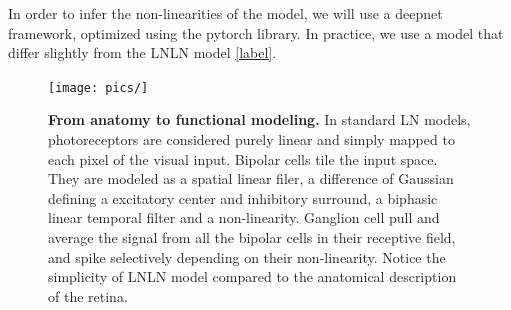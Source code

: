 In order to infer the non-linearities of the model, we will use a deepnet framework, optimized using the pytorch library.
In practice, we use a model that differ slightly from the LNLN model \ref*{label}.

\begin{figure}[h]
    \centering
    \texttt{[image: pics/]}
    \caption{\textbf{From anatomy to functional modeling.} In standard LN
        models,
        photoreceptors are considered purely linear and simply mapped to each
        pixel of
        the visual input. Bipolar cells tile the input space. They are modeled
        as a
        spatial linear filer, a difference of Gaussian defining a excitatory
        center and
        inhibitory surround, a biphasic linear temporal filter and a
        non-linearity.
        Ganglion cell pull and average the signal from all the bipolar cells in
        their
        receptive field, and spike selectively depending on their
        non-linearity. Notice the simplicity of LNLN model compared to the
        anatomical
        description of the retina.}
    \label{fig:retina_structure}
\end{figure}